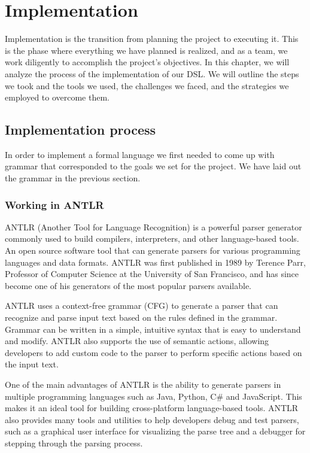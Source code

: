 \chapter{Implementation}
 Implementation is the transition from planning the project to executing it. This is the phase where everything we have planned is realized, and as a team, we work diligently to accomplish the project's objectives. In this chapter, we will analyze the process of the implementation of our DSL. We will outline the steps we took and the tools we used, the challenges we faced, and the strategies we employed to overcome them.
\section{Implementation process} 
In order to implement a formal language we first needed to come up with grammar that corresponded to the goals we set for the project. We have laid out the grammar in the previous section. 

\subsection{Working in ANTLR}
ANTLR (Another Tool for Language Recognition) is a powerful parser generator commonly used to build compilers, interpreters, and other language-based tools. An open source software tool that can generate parsers for various programming languages ​​and data formats. ANTLR was first published in 1989 by Terence Parr, Professor of Computer Science at the University of San Francisco, and has since become one of his generators of the most popular parsers available.

ANTLR uses a context-free grammar (CFG) to generate a parser that can recognize and parse input text based on the rules defined in the grammar. Grammar can be written in a simple, intuitive syntax that is easy to understand and modify. ANTLR also supports the use of semantic actions, allowing developers to add custom code to the parser to perform specific actions based on the input text.

One of the main advantages of ANTLR is the ability to generate parsers in multiple programming languages such as Java, Python, C# and JavaScript. This makes it an ideal tool for building cross-platform language-based tools. ANTLR also provides many tools and utilities to help developers debug and test parsers, such as a graphical user interface for visualizing the parse tree and a debugger for stepping through the parsing process.

